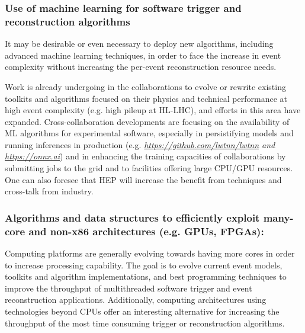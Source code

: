 \documentclass[10pt,a4paper]{article}
\begin{document}
\hypertarget{use-of-machine-learning-for-software-trigger-and-reconstruction-algorithms}{%
\subsubsection{Use of machine learning for software trigger and
reconstruction
algorithms}\label{use-of-machine-learning-for-software-trigger-and-reconstruction-algorithms}}

It may be desirable or even necessary to deploy new algorithms,
including advanced machine learning techniques, in order to face the
increase in event complexity without increasing the per-event
reconstruction resource needs.

Work is already undergoing in the collaborations to evolve or rewrite
existing toolkits and algorithms focused on their physics and technical
performance at high event complexity (e.g. high pileup at HL-LHC), and
efforts in this area have expanded. Cross-collaboration developments are
focusing on the availability of ML algorithms for experimental software,
especially in persistifying models and running inferences in production
(e.g.
\emph{\href{https://github.com/lwtnn/lwtnn}{{https://github.com/lwtnn/lwtnn}}
and \href{https://onnx.ai}{{https://onnx.ai}}}) and in enhancing the
training capacities of collaborations by submitting jobs to the grid and
to facilities offering large CPU/GPU resources. One can also foresee
that HEP will increase the benefit from techniques and cross-talk from
industry.

\hypertarget{algorithms-and-data-structures-to-efficiently-exploit-many-core-and-non-x86-architectures-e.g.-gpus-fpgas}{%
\subsubsection{\texorpdfstring{Algorithms and data structures to
efficiently exploit many-core and non-x86 architectures (e.g. GPUs,
FPGAs):
}{Algorithms and data structures to efficiently exploit many-core and non-x86 architectures (e.g. GPUs, FPGAs): }}\label{algorithms-and-data-structures-to-efficiently-exploit-many-core-and-non-x86-architectures-e.g.-gpus-fpgas}}

Computing platforms are generally evolving towards having more cores in
order to increase processing capability. The goal is to evolve current
event models, toolkits and algorithm implementations, and best
programming techniques to improve the throughput of multithreaded
software trigger and event reconstruction applications. Additionally,
computing architectures using technologies beyond CPUs offer an
interesting alternative for increasing the throughput of the most time
consuming trigger or reconstruction algorithms.
\end{document}
